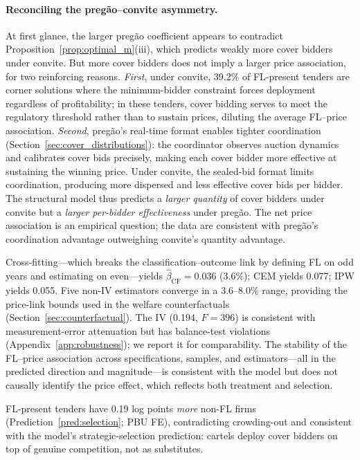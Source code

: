 \paragraph{Reconciling the preg\~ao--convite asymmetry.}
At first glance, the larger preg\~ao coefficient appears to
contradict Proposition~\ref{prop:optimal_m}(iii), which predicts
weakly more cover bidders under convite. But more cover bidders does
not imply a larger price association, for two reinforcing reasons.
\emph{First}, under convite, 39.2\% of FL-present tenders are corner
solutions where the minimum-bidder constraint forces deployment
regardless of profitability; in these tenders, cover bidding serves
to meet the regulatory threshold rather than to sustain prices,
diluting the average FL--price association.
\emph{Second}, preg\~ao's real-time format enables tighter
coordination (Section~\ref{sec:cover_distributions}): the
coordinator observes auction dynamics and calibrates cover bids
precisely, making each cover bidder more effective at sustaining
the winning price. Under convite, the sealed-bid format limits
coordination, producing more dispersed and less effective cover
bids per bidder.
The structural model thus predicts a \emph{larger quantity} of
cover bidders under convite but a \emph{larger per-bidder
effectiveness} under preg\~ao. The net price association is
an empirical question; the data are consistent with preg\~ao's coordination
advantage outweighing convite's quantity advantage.



Cross-fitting---which breaks the classification--outcome link by
defining FL on odd years and estimating on even---yields
$\hat{\beta}_{\text{CF}} = 0.036$ (3.6\%); CEM yields 0.077;
IPW yields 0.055. Five non-IV estimators converge in a 3.6--8.0\%
range, providing the price-link bounds used in the welfare
counterfactuals (Section~\ref{sec:counterfactual}). The IV (0.194,
$F = 396$) is consistent with measurement-error attenuation but
has balance-test violations
(Appendix~\ref{app:robustness}); we report it for comparability.
The stability of the FL--price association across specifications,
samples, and estimators---all in the predicted direction and
magnitude---is consistent with the model but does not causally
identify the price effect, which reflects both treatment and
selection.

FL-present tenders have 0.19 log points \emph{more} non-FL firms
(Prediction~\ref{pred:selection}; PBU FE), contradicting
crowding-out and consistent with the model's strategic-selection
prediction: cartels deploy cover bidders on top of genuine
competition, not as substitutes.

